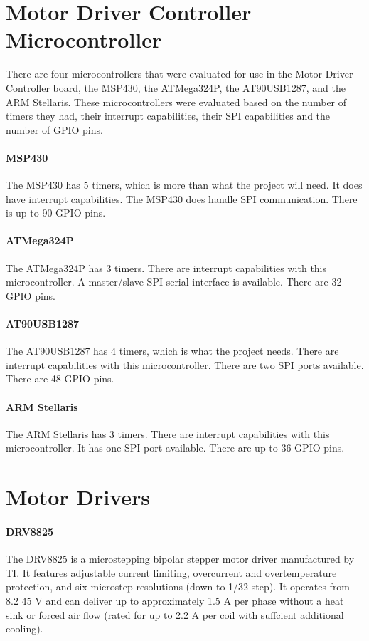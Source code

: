 \section{Motor Driver Controller Microcontroller}
There are four microcontrollers that were evaluated for use in the Motor Driver Controller board, the MSP430, the ATMega324P, the AT90USB1287, and the ARM Stellaris.
These microcontrollers were evaluated based on the number of timers they had, their interrupt capabilities, their SPI capabilities and the number of GPIO pins.

\paragraph{MSP430} The MSP430 has 5 timers, which is more than what the project will need.
It does have interrupt capabilities.
The MSP430 does handle SPI communication. 
There is up to 90 GPIO pins.

\paragraph{ATMega324P} The ATMega324P has 3 timers.
There are interrupt capabilities with this microcontroller.
A master/slave SPI serial interface is available.
There are 32 GPIO pins.   

\paragraph{AT90USB1287} The AT90USB1287 has 4 timers, which is what the project needs.
There are interrupt capabilities with this microcontroller.
There are two SPI ports available. 
There are 48 GPIO pins.

\paragraph{ARM Stellaris} The ARM Stellaris has 3 timers.
There are interrupt capabilities with this microcontroller.
It has one SPI port available.
There are up to 36 GPIO pins.

\section{Motor Drivers}
\paragraph{DRV8825}
The DRV8825 is a microstepping bipolar stepper motor driver manufactured by TI.
It features adjustable current limiting, overcurrent and overtemperature protection, and six microstep resolutions (down to 1/32-step).
It operates from 8.2 45 V and can deliver up to approximately 1.5 A per phase without a heat sink or forced air ﬂow (rated for up to 2.2 A per coil with suffcient additional cooling).

